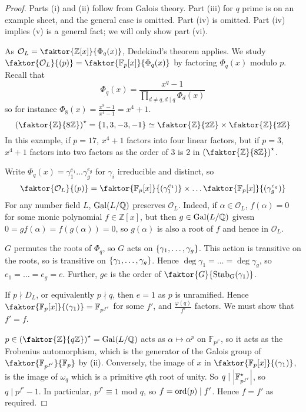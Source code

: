 \begin{proof}
    Parts (i) and (ii) follow from Galois theory.
    Part (iii) for \( q \) prime is on an example sheet, and the general case is omitted.
    Part (iv) is omitted.
    Part (iv) implies (v) is a general fact; we will only show part (vi).

    As \( \mathcal O_L = \faktor{\mathbb Z[x]}{\Phi_q(x)} \), Dedekind's theorem applies.
    We study \( \faktor{\mathcal O_L}{(p)} = \faktor{\mathbb F_p[x]}{\Phi_q(x)} \) by factoring \( \Phi_q(x) \) modulo \( p \).
    Recall that
    \[ \Phi_q(x) = \frac{x^q - 1}{\prod_{d \neq q, d \mid q} \Phi_d(x)} \]
    so for instance \( \Phi_8(x) = \frac{x^8 - 1}{x^4 - 1} = x^4 + 1 \).
    \[ \qty(\faktor{\mathbb Z}{8\mathbb Z})^\star = \qty{1, 3, -3, -1} \simeq \faktor{\mathbb Z}{2\mathbb Z} \times \faktor{\mathbb Z}{2\mathbb Z} \]
    In this example, if \( p = 17 \), \( x^4 + 1 \) factors into four linear factors, but if \( p = 3 \), \( x^4 + 1 \) factors into two factors as the order of 3 is 2 in \( \qty(\faktor{\mathbb Z}{8\mathbb Z})^\star \).

    Write \( \Phi_q(x) = \gamma_1^{e_1} \dots \gamma_g^{e_g} \) for \( \gamma_i \) irreducible and distinct, so
    \[ \faktor{\mathcal O_L}{(p)} = \faktor{\mathbb F_p[x]}{(\gamma_1^{e_1})} \times \dots \faktor{\mathbb F_p[x]}{(\gamma_g^{e_g})} \]
    For any number field \( L \), \( \operatorname{Gal}(L/\mathbb Q) \) preserves \( \mathcal O_L \).
    Indeed, if \( \alpha \in \mathcal O_L \), \( f(\alpha) = 0 \) for some monic polynomial \( f \in \mathbb Z[x] \), but then \( g \in \operatorname{Gal}(L/\mathbb Q) \) givesn \( 0 = gf(\alpha) = f(g(\alpha)) = 0 \), so \( g(\alpha) \) is also a root of \( f \) and hence in \( \mathcal O_L \).

    \( G \) permutes the roots of \( \Phi_q \), so \( G \) acts on \( \qty{\gamma_1, \dots, \gamma_g} \).
    This action is transitive on the roots, so is transitive on \( \qty{\gamma_1, \dots, \gamma_g} \).
    Hence \( \deg \gamma_1 = \dots = \deg \gamma_g \), so \( e_1 = \dots = e_g = e \).
    Further, \( ge \) is the order of \( \faktor{G}{\Stab_G(\gamma_1)} \).

    If \( p \nmid D_L \), or equivalently \( p \nmid q \), then \( e = 1 \) as \( p \) is unramified.
    Hence \( \faktor{\mathbb F_p[x]}{(\gamma_1)} = \mathbb F_{p^{f'}} \) for some \( f' \), and \( \frac{\varphi(q)}{f'} \) factors.
    We must show that \( f' = f \).

    \( p \in \qty(\faktor{\mathbb Z}{q\mathbb Z})^\star = \Gal(L/\mathbb Q) \) acts as \( \alpha \mapsto \alpha^p \) on \( \mathbb F_{p^{f'}} \), so it acts as the Frobenius automorphism, which is the generator of the Galois group of \( \faktor{\mathbb F_{p^{f'}}}{\mathbb F_p} \) by (ii).
    Conversely, the image of \( x \) in \( \faktor{\mathbb F_p[x]}{(\gamma_1)} \), is the image of \( \omega_q \) which is a primitive \( q \)th root of unity.
    So \( q \mid \abs{\mathbb F_{p^{f'}}^\star} \), so \( q \mid p^{f'} - 1 \).
    In particular, \( p^{f'} \equiv 1 \) mod \( q \), so \( f = \operatorname{ord}(p) \mid f' \).
    Hence \( f = f' \) as required.
\end{proof}
